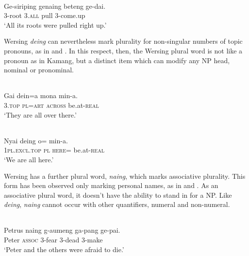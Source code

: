 \ea%
\label{ex:9:60}
 \\
\gll  Ge-siriping genaing beteng ge-dai. \\
 \textsc{3-}root \textsc{3.all}   pull 3-come.up    \\
\glt `All its roots were pulled right up.'
\z





Wersing \textit{d}\textit{eing} can nevertheless mark plurality for non-singular numbers of topic pronouns, as in  and . In this respect, then, the Wersing plural word is not like a pronoun as in Kamang, but a distinct item which can modify any NP head, nominal or pronominal.


\ea%
\label{ex:9:61}
 \\
\gll  Gai dein=a mona min-a. \\
   \textsc{3.top} \textsc{pl}=\textsc{art} \textsc{across} be.at-\textsc{real}  \\
\glt `They are all over there.'
\z







\ea%
\label{ex:9:62}
 \\
\gll  Nyai deing o= min-a. \\
  \textsc{1pl.excl.top} \textsc{pl}   \textsc{here=} be.at-\textsc{real}   \\
\glt `We are all here.'
\z






Wersing has a further plural word, \textit{naing}, which marks associative plurality. This form has been observed only marking personal names, as in  and . As an associative plural word, it doesn't have the ability to stand in for a NP. Like \textit{deing}, \textit{naing} cannot occur with other quantifiers, numeral and non-numeral.


\ea%
\label{ex:9:63}
 \\
\gll  Petrus naing g-aumeng ga-pang ge-pai. \\
  Peter \textsc{assoc} 3-fear 3-dead 3-make   \\
\glt `Peter and the others were afraid to die.'
\z







